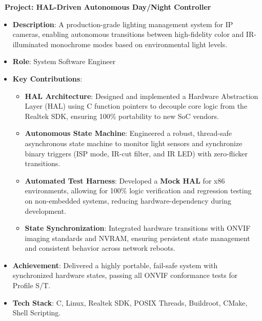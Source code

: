\documentclass[letterpaper,10pt]{article}
\newenvironment{resume_list}{
  \vspace{-7pt}
  \begin{itemize}[itemsep=-2px, parsep=1pt, leftmargin=30pt]
}{
  \end{itemize}
}
\begin{document}
\begin{resume_list}
       \item \textbf{\faMoon\ Project: HAL-Driven Autonomous Day/Night Controller}
        \begin{itemize}[itemsep=1pt, leftmargin=15pt, label=-]
          \item \textbf{Description}: A production-grade lighting management system for IP cameras, enabling autonomous transitions between high-fidelity color and IR-illuminated monochrome modes based on environmental light levels.
          \item \textbf{Role}: System Software Engineer
          \item \textbf{Key Contributions}:
            \begin{itemize}[itemsep=0pt, leftmargin=10pt, label=$\circ$]
               \item \textbf{HAL Architecture}: Designed and implemented a Hardware Abstraction Layer (HAL) using C function pointers to decouple core logic from the Realtek SDK, ensuring 100\% portability to new SoC vendors.
               \item \textbf{Autonomous State Machine}: Engineered a robust, thread-safe asynchronous state machine to monitor light sensors and synchronize binary triggers (ISP mode, IR-cut filter, and IR LED) with zero-flicker transitions.
               \item \textbf{Automated Test Harness}: Developed a \textbf{Mock HAL} for x86 environments, allowing for 100\% logic verification and regression testing on non-embedded systems, reducing hardware-dependency during development.
               \item \textbf{State Synchronization}: Integrated hardware transitions with ONVIF imaging standards and NVRAM, ensuring persistent state management and consistent behavior across network reboots.
            \end{itemize}
          \item \textbf{Achievement}: Delivered a highly portable, fail-safe system with synchronized hardware states, passing all ONVIF conformance tests for Profile S/T.
          \item \textbf{Tech Stack}: C, Linux, Realtek SDK, POSIX Threads, Buildroot, CMake, Shell Scripting.
        \end{itemize}


\end{resume_list}
\end{document}

